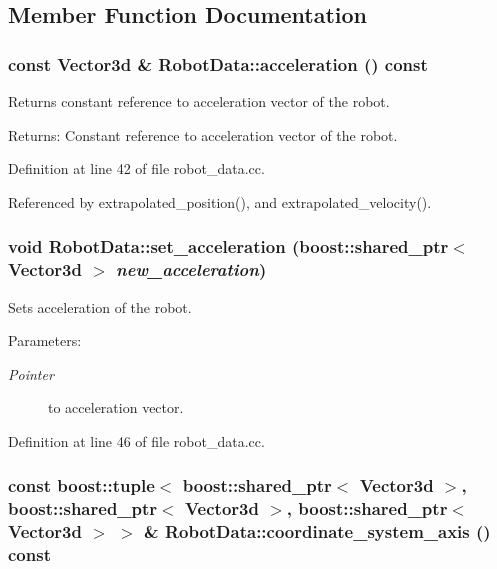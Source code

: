 \subsection{Member Function Documentation}
\hypertarget{class_robot_data_a65f6448e4ec4061b6300283f3cdd8da}{
\subsubsection[acceleration]{\setlength{\rightskip}{0pt plus 5cm}const Vector3d \& RobotData::acceleration () const}}
\label{class_robot_data_a65f6448e4ec4061b6300283f3cdd8da}


Returns constant reference to acceleration vector of the robot. \begin{Desc}
\item[Returns:]Constant reference to acceleration vector of the robot. \end{Desc}


Definition at line 42 of file robot\_\-data.cc.

Referenced by extrapolated\_\-position(), and extrapolated\_\-velocity().\hypertarget{class_robot_data_8799d69f51da76c16da773ca4cf8a8c5}{
\subsubsection[set\_\-acceleration]{\setlength{\rightskip}{0pt plus 5cm}void RobotData::set\_\-acceleration (boost::shared\_\-ptr$<$ Vector3d $>$ {\em new\_\-acceleration})}}
\label{class_robot_data_8799d69f51da76c16da773ca4cf8a8c5}


Sets acceleration of the robot. \begin{Desc}
\item[Parameters:]
\begin{description}
\item[{\em Pointer}]to acceleration vector. \end{description}
\end{Desc}


Definition at line 46 of file robot\_\-data.cc.\hypertarget{class_robot_data_e093fc063e47ad844c20a9332c5bea6a}{
\subsubsection[coordinate\_\-system\_\-axis]{\setlength{\rightskip}{0pt plus 5cm}const boost::tuple$<$ boost::shared\_\-ptr$<$ Vector3d $>$, boost::shared\_\-ptr$<$ Vector3d $>$, boost::shared\_\-ptr$<$ Vector3d $>$ $>$ \& RobotData::coordinate\_\-system\_\-axis () const}}
\label{class_robot_data_e093fc063e47ad844c20a9332c5bea6a}


